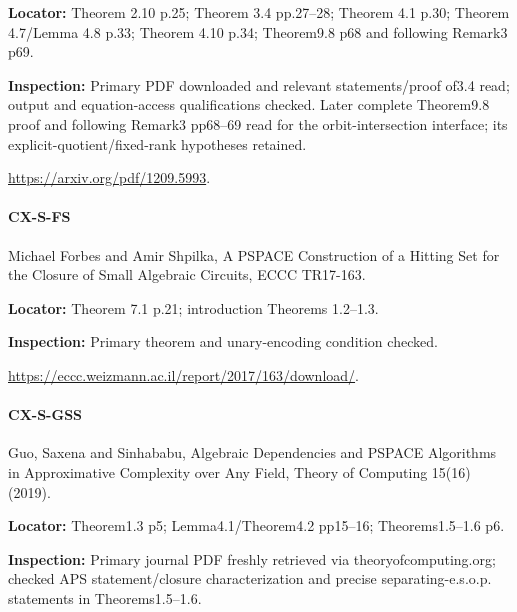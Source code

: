 \documentclass[11pt,a4paper]{article}
\begin{document}
\textbf{Locator:} Theorem 2.\allowbreak{}10 p.\allowbreak{}25; Theorem 3.\allowbreak{}4 pp.\allowbreak{}27–\allowbreak{}28; Theorem 4.\allowbreak{}1 p.\allowbreak{}30; Theorem 4.\allowbreak{}7/\allowbreak{}Lemma 4.\allowbreak{}8 p.\allowbreak{}33; Theorem 4.\allowbreak{}10 p.\allowbreak{}34; Theorem9.\allowbreak{}8 p68 and following Remark3 p69.

\textbf{Inspection:} Primary PDF downloaded and relevant statements/\allowbreak{}proof of3.\allowbreak{}4 read; output and equation-access qualifications checked.\allowbreak{} Later complete Theorem9.\allowbreak{}8 proof and following Remark3 pp68–\allowbreak{}69 read for the orbit-intersection interface; its explicit-quotient/\allowbreak{}fixed-rank hypotheses retained.\allowbreak{}

\url{https://arxiv.org/pdf/1209.5993}.

\paragraph{CX-S-FS} Michael Forbes and Amir Shpilka, A PSPACE Construction of a Hitting Set for the Closure of Small Algebraic Circuits, ECCC TR17-163.

\textbf{Locator:} Theorem 7.\allowbreak{}1 p.\allowbreak{}21; introduction Theorems 1.\allowbreak{}2–\allowbreak{}1.\allowbreak{}3.

\textbf{Inspection:} Primary theorem and unary-encoding condition checked.\allowbreak{}

\url{https://eccc.weizmann.ac.il/report/2017/163/download/}.

\paragraph{CX-S-GSS} Guo, Saxena and Sinhababu, Algebraic Dependencies and PSPACE Algorithms in Approximative Complexity over Any Field, Theory of Computing 15(16) (2019).

\textbf{Locator:} Theorem1.\allowbreak{}3 p5; Lemma4.\allowbreak{}1/\allowbreak{}Theorem4.\allowbreak{}2 pp15–\allowbreak{}16; Theorems1.\allowbreak{}5–\allowbreak{}1.\allowbreak{}6 p6.

\textbf{Inspection:} Primary journal PDF freshly retrieved via theoryofcomputing.\allowbreak{}org; checked APS statement/\allowbreak{}closure characterization and precise separating-e.\allowbreak{}s.\allowbreak{}o.\allowbreak{}p.\allowbreak{} statements in Theorems1.\allowbreak{}5–\allowbreak{}1.\allowbreak{}6.\allowbreak{}
\end{document}
